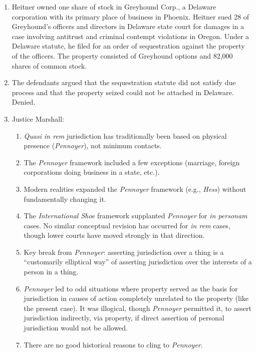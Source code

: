 \begin{enumerate}
    \item Heitner owned one share of stock in Greyhound Corp., a
    Delaware corporation with its primary place of business in Phoenix.
    Heitner sued 28 of Greyhound's officers and directors in Delaware state court for 
    damages in a case involving antitrust and criminal contempt violations in 
    Oregon. Under a Delaware statute, he filed for an order of sequestration 
    against
    the property of the officers. The property consisted of Greyhound
    options and 82,000 shares of common stock.
    \item The defendants argued that the sequestration statute did not satisfy 
    due process and that the property seized could not be attached in
    Delaware. Denied.
    \item Justice Marshall:
    \begin{enumerate}
        \item \emph{Quasi in rem} jurisdiction has traditionally been based on 
        physical presence (\emph{Pennoyer}), not minimum contacts.
        \item The \emph{Pennoyer} framework included a few exceptions 
        (marriage, foreign corporations doing business in a state, etc.).
        \item Modern realities expanded the \emph{Pennoyer} framework (e.g., 
        \emph{Hess}) without fundamentally changing it.
        \item The \emph{International Shoe} framework supplanted 
        \emph{Pennoyer} for \emph{in personam} cases. No similar conceptual 
        revision has occurred for \emph{in rem} cases, though lower courts 
        have moved strongly in that direction.
        \item Key break from \emph{Pennoyer}: asserting jurisdiction over a 
        thing is a ``customarily elliptical way'' of asserting jurisdiction 
        over the interests of a person in a thing.
        \item \emph{Pennoyer} led to odd situations where property served as 
        the basis for jurisdiction in causes of action completely unrelated to 
        the property (like the present case). It was illogical, though 
        \emph{Pennoyer} permitted it, to assert jurisdiction indirectly, via 
        property, if direct assertion of personal jurisdiction would not be 
        allowed.
        \item There are no good historical reasons to cling to 
        \emph{Pennoyer}.

\end{enumerate}
\end{enumerate}

